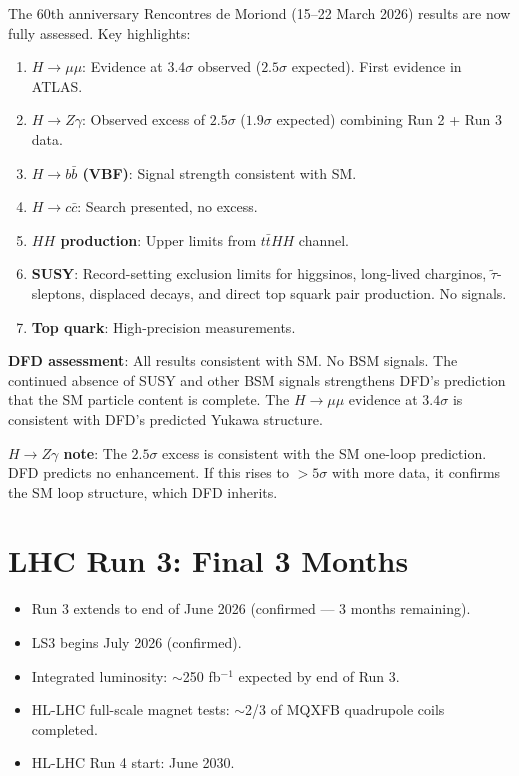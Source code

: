 \documentclass[11pt,a4paper]{article}
\begin{document}
\begin{tcolorbox}[colback=blue!5!white, colframe=blue!60!black,
  title={ATLAS Moriond 2026: 45 Analyses --- Full Assessment}]

The 60th anniversary Rencontres de Moriond (15--22 March 2026) results are now fully assessed. Key highlights:

\begin{enumerate}
\item \textbf{$H \to \mu\mu$}: Evidence at $3.4\sigma$ observed ($2.5\sigma$ expected). First evidence in ATLAS.
\item \textbf{$H \to Z\gamma$}: Observed excess of $2.5\sigma$ ($1.9\sigma$ expected) combining Run 2 + Run 3 data.
\item \textbf{$H \to b\bar{b}$ (VBF)}: Signal strength consistent with SM.
\item \textbf{$H \to c\bar{c}$}: Search presented, no excess.
\item \textbf{$HH$ production}: Upper limits from $t\bar{t}HH$ channel.
\item \textbf{SUSY}: Record-setting exclusion limits for higgsinos, long-lived charginos, $\tilde{\tau}$-sleptons, displaced decays, and direct top squark pair production. No signals.
\item \textbf{Top quark}: High-precision measurements.
\end{enumerate}

\textbf{DFD assessment}: All results consistent with SM. No BSM signals. The continued absence of SUSY and other BSM signals strengthens DFD's prediction that the SM particle content is complete. The $H \to \mu\mu$ evidence at $3.4\sigma$ is consistent with DFD's predicted Yukawa structure.

\textbf{$H \to Z\gamma$ note}: The $2.5\sigma$ excess is consistent with the SM one-loop prediction. DFD predicts no enhancement. If this rises to $> 5\sigma$ with more data, it confirms the SM loop structure, which DFD inherits.
\end{tcolorbox}

\section{LHC Run 3: Final 3 Months}

\begin{itemize}
\item Run 3 extends to end of June 2026 (confirmed --- 3 months remaining).
\item LS3 begins July 2026 (confirmed).
\item Integrated luminosity: $\sim$250 fb$^{-1}$ expected by end of Run 3.
\item HL-LHC full-scale magnet tests: $\sim$2/3 of MQXFB quadrupole coils completed.
\item HL-LHC Run 4 start: June 2030.
\end{itemize}
\end{document}
